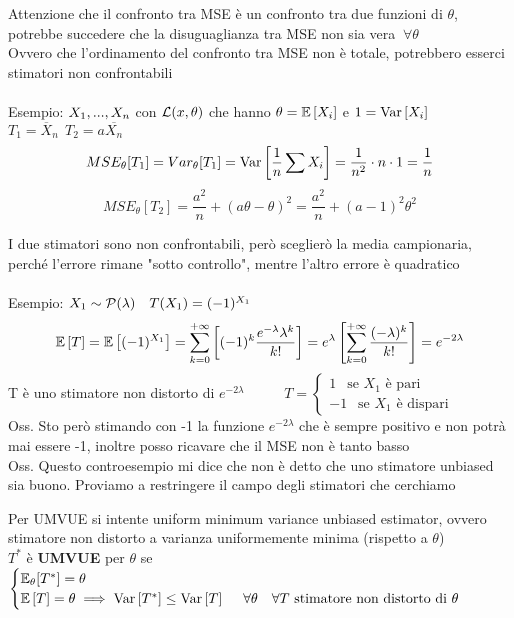 Attenzione che il confronto tra MSE è un confronto tra due funzioni di $\theta$, potrebbe succedere che la disuguaglianza tra MSE non sia vera $\ \forall\theta$ \\
Ovvero che l'ordinamento del confronto tra MSE non è totale, potrebbero esserci stimatori non confrontabili\\ \\






Esempio: $X_1,...,X_n$ con $\mathcal L(x,\theta)$ che hanno $\theta=\mathbb{E} \left[ X_i \right]$ e $1=\text{Var} \left[ X_i \right]$\\
$T_1=\overline{X}_n \ \ T_2=a\overline{X_n}$\\
\[MSE_{\theta}[T_1]=Var_{\theta}[T_1]=\text{Var} \left[ \dfrac{1}{n}\sum X_i \right]=\dfrac{1}{n^2}\cdot n\cdot 1=\dfrac{1}{n}\]
\[MSE_{\theta} [T_2] = \frac{a^2}{n}+(a\theta-\theta)^2=\frac{a^2}{n}+(a-1)^2\theta^2\]



I due stimatori sono non confrontabili, però sceglierò la media campionaria, perché l'errore rimane "sotto controllo", mentre l'altro errore è quadratico\\ \\



Esempio: $X_1\sim \Pc(\lambda) \ \ \ T(X_1)=(-1)^{X_1}$ 
\[\mathbb{E} \left[ T \right]= \mathbb{E} \left[ (-1)^{X_1} \right]=\sum\limits_{k=0}^{+\infty}\left[(-1)^k\dfrac{e^{-\lambda}\lambda^k}{k!}\right] = e^{\lambda} \left[\sum\limits_{k=0}^{+\infty}\dfrac{(-\lambda)^k}{k!}\right]=e^{-2\lambda}\]
T è uno stimatore non distorto di $e^{-2\lambda}$ \ \ \  \ \ $T=\begin{cases}
    1 \ \ \text{ se $X_1$ è pari}\\
    -1 \ \ \text{ se $X_1$ è dispari}
\end{cases}$ \\

Oss. Sto però stimando con -1 la funzione $e^{-2\lambda}$  che è sempre positivo e non potrà mai essere -1, inoltre posso ricavare che il MSE non è tanto basso\\
Oss. Questo controesempio mi dice che non è detto che uno stimatore unbiased sia buono.
Proviamo a restringere il campo degli stimatori che cerchiamo\\


\begin{defi}
    Per UMVUE si intente uniform minimum variance unbiased estimator, ovvero stimatore non distorto a varianza uniformemente minima (rispetto a $\theta$)\\
    $T^*$ è \textbf{UMVUE} per $\theta$ se \ $\begin{cases}
        \mathbb E_{\theta}[T^*]=\theta\\
         \mathbb{E} \left[ T \right]=\theta \implies \text{Var} \left[ T^* \right]\le\text{Var} \left[ T \right]\  \ \ \  \forall \theta \ \ \  \forall T \text{ stimatore non distorto di } \theta
    \end{cases}$
\end{defi}
\phantom{}\\

